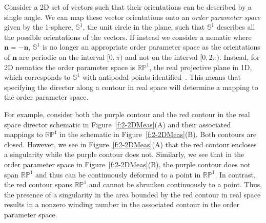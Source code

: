 Consider a 2D set of vectors such that their orientations can be described by a single angle.
We can map these vector orientations onto an \emph{order parameter space} given by the 1-sphere, $\mathbb{S}^1$, the unit circle in the plane, such that $\mathbb{S}^1$ describes all the possible orientations of the vectors.
If instead we consider a nematic where $\mathbf{n} = -\mathbf{n}$, $\mathbb{S}^1$ is no longer an appropriate order parameter space as the orientations of $\mathbf{n}$ are periodic on the interval $[0,\pi)$ and not on the interval $[0,2 \pi)$.
Instead, for 2D nematics the order parameter space is $\mathbb{R}\mathbb{P}^1$, the real projective plane in 1D, which corresponds to $\mathbb{S}^1$ with antipodal points identified~\cite{RN196,RN153,RN236}.
This means that specifying the director along a contour in real space will determine a mapping to the order parameter space.

For example, consider both the purple contour and the red contour in the real space director schematic in Figure~\ref{f:2-2DMeas}(A) and their associated mappings to $\mathbb{R}\mathbb{P}^1$ in the schematic in Figure~\ref{f:2-2DMeas}(B).
Both contours are closed.
However, we see in Figure~\ref{f:2-2DMeas}(A) that the red contour encloses a singularity while the purple contour does not.
Similarly, we see that in the order parameter space in Figure~\ref{f:2-2DMeas}(B), the purple contour does not span $\mathbb{RP}^1$ and thus can be continuously deformed to a point in $\mathbb{R}\mathbb{P}^1$.
In contrast, the red contour spans $\mathbb{RP}^1$ and cannot be shrunken continuously to a point.
Thus, the presence of a singularity in the area bounded by the red contour in real space results in a nonzero winding number in the associated contour in the order parameter space.

